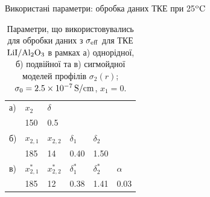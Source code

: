 \documentclass[10pt]{beamer}
\begin{document}
\begin{frame}{Використані параметри: обробка даних ТКЕ при 25$\rm ^{o}C$}
\footnotesize

\begin{table}[tb]
	\caption{\label{tab:Liang} Параметри, що використовувались для обробки
		даних з $\sigma_{\rm eff}$ для ТКЕ $\rm{LiI/Al_2O_3}$
		в рамках а) однорідної, б) подвійної та в) сигмойдної 
		моделей профілів $\sigma_2(r)$;
		$\sigma_0 = 2.5 \times 10^{-7}\,{\rm S/cm}$,  $x_1 = 0$.}
	\begin{center}
		\begin{tabular}{|l|l|l|l|l|l|}
			\hline
			а) & $x_2$ & $\delta$ & &  &  \\
			& 150    & 0.5   &  &  & \\
			\hline
			б)  & $x_{2,1}$   &$x_{2,2}$ & $\delta_1$ & $\delta_2$ &  \\
			& 185         & 14  & 0.40       & 1.50       &  \\
			\hline
			в)  & $x^{\ast}_{2,1}$    &$x^{\ast}_{2,2}$    & $\delta^{\ast}_1$ & $\delta^{\ast}_2$ &  $\alpha$ \\
			& 185         & 12        & 0.38       & 1.41       &   0.03    \\
			\hline
		\end{tabular}
	\end{center}
\end{table}

\end{frame}
\end{document}
